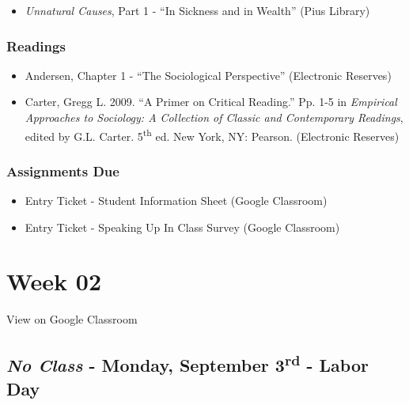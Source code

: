 \documentclass[]{book}
\providecommand{\tightlist}{%
  \setlength{\itemsep}{0pt}\setlength{\parskip}{0pt}}
\theoremstyle{definition}
\theoremstyle{definition}
\theoremstyle{definition}
\theoremstyle{remark}
\begin{document}
\begin{itemize}
\tightlist
\item
  \emph{Unnatural Causes}, Part 1 - ``In Sickness and in Wealth'' (Pius
  Library)
\end{itemize}

\hypertarget{readings-1}{%
\subsubsection*{Readings}\label{readings-1}}

\begin{itemize}
\tightlist
\item
  Andersen, Chapter 1 - ``The Sociological Perspective'' (Electronic
  Reserves)
\item
  Carter, Gregg L. 2009. ``A Primer on Critical Reading.'' Pp. 1-5 in
  \emph{Empirical Approaches to Sociology: A Collection of Classic and
  Contemporary Readings}, edited by G.L. Carter. 5\textsuperscript{th}
  ed. New York, NY: Pearson. (Electronic Reserves)
\end{itemize}

\hypertarget{assignments-due}{%
\subsubsection*{Assignments Due}\label{assignments-due}}

\begin{itemize}
\tightlist
\item
  Entry Ticket - Student Information Sheet (Google Classroom)
\item
  Entry Ticket - Speaking Up In Class Survey (Google Classroom)
\end{itemize}

\hypertarget{week-02}{%
\section*{Week 02}\label{week-02}}

View on Google Classroom

\hypertarget{no-class---monday-september-3rd---labor-day}{%
\subsection*{\texorpdfstring{\emph{No Class} - Monday, September
3\textsuperscript{rd} - Labor
Day}{No Class - Monday, September 3rd - Labor Day}}\label{no-class---monday-september-3rd---labor-day}}
\end{document}
